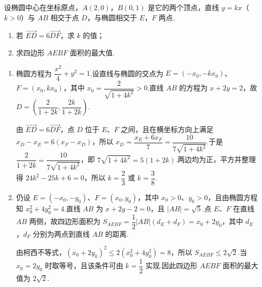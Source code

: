 \begin{problem}
设椭圆中心在坐标原点，\(A(2,0)\)，\(B(0,1)\) 是它的两个顶点，直线 \(y = kx\)（\(k > 0\)）与 \(AB\) 相交于点 \(D\)，与椭圆相交于 \(E\)，\(F\) 两点.

\begin{enumerate}
\item 若 \(\overrightarrow{ED} = 6\overrightarrow{DF}\)，求 \(k\) 的值；
\item 求四边形 \(AEBF\) 面积的最大值.
\end{enumerate}
\end{problem}

\begin{solution}
\begin{enumerate}
\item 椭圆方程为 \(\dfrac{x^2}{4}+y^2=1\).设直线与椭圆的交点为 \(E=(-x_0,-kx_0)\)、\(F=(x_0,kx_0)\)，其中 \(x_0=\dfrac{2}{\sqrt{1+4k^2}}>0\).直线 \(AB\) 的方程为 \(x+2y=2\)，故
\(D=\left(\dfrac{2}{1+2k},\dfrac{2k}{1+2k}\right)\).

由 \(\overrightarrow{ED}=6\overrightarrow{DF}\)，点 \(D\) 位于 \(E\)、\(F\) 之间，且在横坐标方向上满足 \(x_D-x_E=6(x_F-x_D)\)，所以 \(x_D=\dfrac{x_E+6x_F}{7}=\dfrac{10}{7\sqrt{1+4k^2}}\).于是
\(\dfrac{2}{1+2k}=\dfrac{10}{7\sqrt{1+4k^2}}\)，即 \(7\sqrt{1+4k^2}=5(1+2k)\).两边均为正，平方并整理得 \(24k^2-25k+6=0\)，所以 \(k=\dfrac23\) 或 \(k=\dfrac38\).
\item 仍设 \(E=(-x_0,-y_0)\)、\(F=(x_0,y_0)\)，其中 \(x_0>0\)、\(y_0>0\)，且由椭圆方程知 \(x_0^2+4y_0^2=4\).直线 \(AB\) 为 \(x+2y-2=0\)，且 \(|AB|=\sqrt5\).点 \(E\)、\(F\) 在直线 \(AB\) 两侧，故四边形面积为
\(S_{AEBF}=\dfrac12|AB|(d_E+d_F)=x_0+2y_0\)，其中 \(d_E\)，\(d_F\) 分别为两点到直线 \(AB\) 的距离.

由柯西不等式，\((x_0+2y_0)^2\leqslant2(x_0^2+4y_0^2)=8\)，所以 \(S_{AEBF}\leqslant2\sqrt2\).当 \(x_0=2y_0\) 时取等号，且该条件可由 \(k=\dfrac12\) 实现.因此四边形 \(AEBF\) 面积的最大值为 \(2\sqrt2\).
\end{enumerate}
\end{solution}
